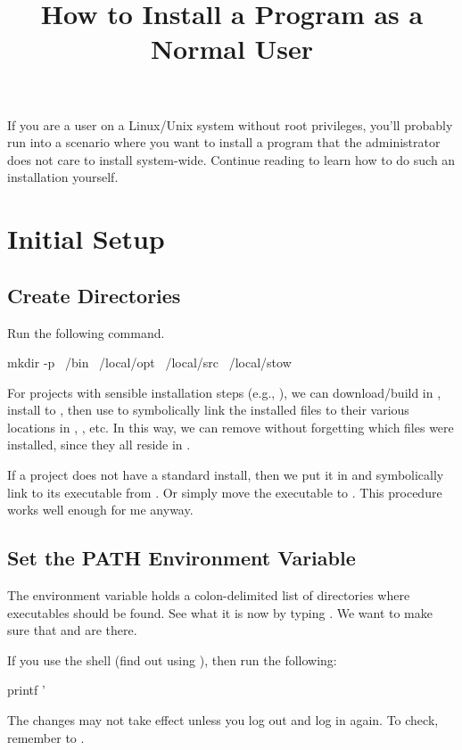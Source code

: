
\title[Install Program as Normal User]{How to Install a Program as a Normal User}
\date{}



\tableofcontents

If you are a user on a Linux/Unix system without root privileges, you'll probably run into a scenario where you want to install a program that the administrator does not care to install system-wide.
Continue reading to learn how to do such an installation yourself.


\section{Initial Setup}

\subsection{Create Directories}

Run the following command.
\begin{code}
mkdir -p ~/bin ~/local/opt ~/local/src ~/local/stow
\end{code}
For projects with sensible installation steps (e.g., ), we can download/build in , install to , then use  to symbolically link the installed files to their various locations in , , etc.
In this way, we can remove  without forgetting which files were installed, since they all reside in .

If a project  does not have a standard install, then we put it in  and symbolically link to its executable from .
Or simply move the executable to .
This procedure works well enough for me anyway.

\subsection{Set the PATH Environment Variable}
\label{sec:PATH}

The  environment variable holds a colon-delimited list of directories where executables should be found.
See what it is now by typing .
We want to make sure that  and  are there.

If you use the  shell (find out using ), then run the following:
\begin{code}
printf '%
\end{code}
The changes may not take effect unless you log out and log in again.
To check, remember to .

